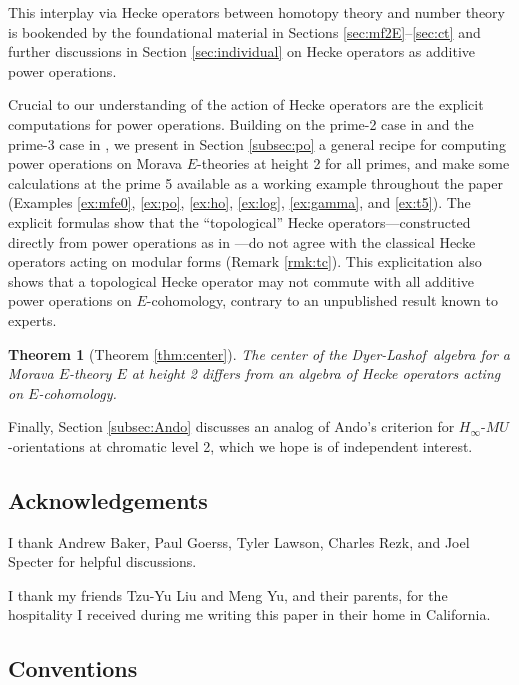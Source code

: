 \documentclass{gtpart}
\newtheorem{thm}[equation]{Theorem}
\theoremstyle{definition}
\theoremstyle{remark}
\newcommand{\DL}{Dyer-Lashof~}
\renewcommand{\=}{\approx}
\renewcommand{\-}{\sim}
\numberwithin{equation}{section}
\begin{document}
This interplay via Hecke operators between homotopy theory and number theory is 
bookended by the foundational material in Sections \ref{sec:mf2E}--\ref{sec:ct} 
and further discussions in Section \ref{sec:individual} on Hecke operators as 
additive power operations.  

Crucial to our understanding of the action of Hecke operators are the explicit 
computations for power operations.  Building on the prime-2 case in \cite{h2p2} 
and the prime-3 case in \cite{p3}, we present in Section \ref{subsec:po} a 
general recipe for computing power operations on Morava $E$-theories at height 2 
for all primes, and make some calculations at the prime 5 available as a working 
example throughout the paper (Examples \ref{ex:mfe0}, \ref{ex:po}, \ref{ex:ho}, 
\ref{ex:log}, \ref{ex:gamma}, and \ref{ex:t5}).  The explicit formulas show that 
the ``topological'' Hecke operators---constructed directly from power operations 
as in \cite[Proposition 3.6.2]{Ando95}---do not agree with the classical Hecke 
operators acting on modular forms (Remark \ref{rmk:tc}).  This explicitation 
also shows that a topological Hecke operator may not commute with all additive 
power operations on $E$-cohomology, contrary to an unpublished result known to 
experts.  

\begin{thm}[{Theorem \ref{thm:center}}]
 The center of the \DL algebra for a Morava $E$-theory $E$ at height 2 differs 
 from an algebra of Hecke operators acting on $E$-cohomology.  
\end{thm}

Finally, Section \ref{subsec:Ando} discusses an analog of Ando's criterion for 
$H_\infty$-$MU$-orientations at chromatic level 2, which we hope is of 
independent interest.  



\subsection{Acknowledgements}

I thank Andrew Baker, Paul Goerss, Tyler Lawson, Charles Rezk, and Joel Specter 
for helpful discussions.  

I thank my friends Tzu-Yu Liu and Meng Yu, and their parents, for the 
hospitality I received during me writing this paper in their home in California.  



\subsection{Conventions}
\end{document}
